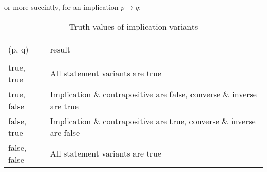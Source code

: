or more succintly, for an implication $p \to q$:

\begin{table}[!htb]
    \begin{subtable}{\linewidth}
        \centering
        \caption*{Truth values of implication variants}
        \label{tbl:implication-variants}
        \begin{tabular}{ *{2}{l} }
            \toprule \\
            (p, q) & result \\
            \midrule \\
            true, true & All statement variants are true \\
            true, false & Implication \& contrapositive are false, converse \& inverse are true \\
            false, true & Implication \& contrapositive are true, converse \& inverse are false \\
            false, false & All statement variants are true \\
            \bottomrule
        \end{tabular}
    \end{subtable}%
\end{table}

%
